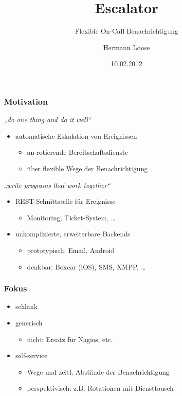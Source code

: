 \documentclass[slidestop,compress,red]{beamer}
\title{Escalator}
\subtitle{Flexible On-Call Benachrichtigung}
\author{Hermann Loose}
\date{10.02.2012}
\begin{document}
\frame[plain]{\titlepage}

\begin{frame}[plain]
  \frametitle{Motivation}
  \begin{flushleft}
    \emph{„do one thing and do it well“}
  \end{flushleft}
  \begin{itemize}
    \item automatische Eskalation von Ereignissen
    \begin{itemize}
      \item an rotierende Bereitschaftsdienste
      \item über flexible Wege der Benachrichtigung
    \end{itemize}
  \end{itemize}
  \begin{flushleft}
    \emph{„write programs that work together“}
  \end{flushleft}
  \begin{itemize}
    \item REST-Schnittstelle für Ereignisse
    \begin{itemize}
      \item Monitoring, Ticket-System, …
    \end{itemize}
    \item unkomplizierte, erweiterbare Backends
    \begin{itemize}
      \item prototypisch: Email, Android
      \item denkbar: Boxcar (iOS), SMS, XMPP, …
    \end{itemize}
  \end{itemize}
\end{frame}

\begin{frame}[c,plain]
  \frametitle{Fokus}
  \begin{itemize}
    \item schlank
    \item generisch
    \begin{itemize}
      \item nicht: Ersatz für Nagios, etc.
    \end{itemize}
    \item self-service
    \begin{itemize}
      \item Wege und zeitl. Abstände der Benachrichtigung
      \item perspektivisch: z.B. Rotationen mit Diensttausch
    \end{itemize}
  \end{itemize}
\end{frame}
\end{document}
